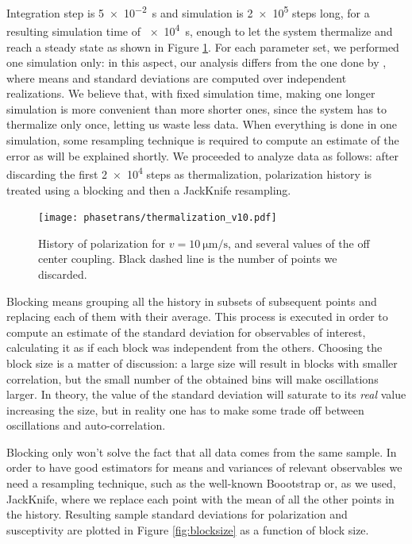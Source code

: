 \documentclass[../../master_thesis_np.tex]{subfiles}
\begin{document}
		Integration step is \SI{5e-2}{\second} and simulation is \num{2e5} steps long, for a resulting simulation time of \SI{e4}{\second}, enough to let the system thermalize and reach a steady state as shown in Figure \ref{fig:polar_therm}.
		For each parameter set, we performed one simulation only: in this aspect, our analysis differs from the one done by \citeauthor{martin-gomez_collective_2018}, where means and standard deviations are computed over independent realizations.
		We believe that, with fixed simulation time, making one longer simulation is more convenient than more shorter ones, since the system has to thermalize only once, letting us waste less data.
		When everything is done in one simulation, some resampling technique is required to compute an estimate of the error as will be explained shortly.
		We proceeded to analyze data as follows: after discarding the first \num{2e4} steps as thermalization, polarization history is treated using a blocking and then a JackKnife resampling.
		
		\begin{figure}[htp]
			\centering
			\texttt{[image: phasetrans/thermalization\_v10.pdf]}
			\caption{History of polarization for $v = \SI{10}{\um\per\second}$, and several values of the off center coupling. Black dashed line is the number of points we discarded.}
			\label{fig:polar_therm}
		\end{figure}
		
		Blocking means grouping all the history in subsets of subsequent points and replacing each of them with their average.
		This process is executed in order to compute an estimate of the standard deviation for observables of interest, calculating it as if each block was independent from the others. 
		Choosing the block size is a matter of discussion: a large size will result in blocks with smaller correlation, but the small number of the obtained bins will make oscillations larger. 
		In theory, the value of the standard deviation will saturate to its \emph{real} value increasing the size, but in reality one has to make some trade off between oscillations and auto-correlation.

		Blocking only won't solve the fact that all data comes from the same sample.
		In order to have good estimators for means and variances of relevant observables we need a resampling technique, such as the well-known Boootstrap or, as we used, JackKnife, where we replace each point with the mean of all the other points in the history.
		Resulting sample standard deviations for polarization and susceptivity are plotted in Figure \ref{fig:blocksize} as a function of block size.
		
\end{document}
